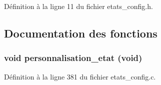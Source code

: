 Définition à la ligne 11 du fichier etats\_\-config.h.



\subsection{Documentation des fonctions}
\subsubsection[{personnalisation\_\-etat}]{\setlength{\rightskip}{0pt plus 5cm}void personnalisation\_\-etat (void)}\label{etats__config_8h_a9b69a48d62d062235b3e849dbf5cd951}


Définition à la ligne 381 du fichier etats\_\-config.c.

